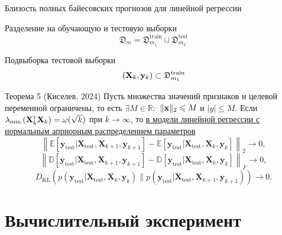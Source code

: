 \documentclass[aspectratio=169]{beamer}
\begin{document}
\begin{frame}{Близость полных байесовских прогнозов для линейной регрессии}
    \begin{block}{Разделение на обучающую и тестовую выборки}
        \vspace{-0.3cm}
        \[ \mathfrak{D}_m = \mathfrak{D}_{m_1}^{\text{train}} \sqcup \mathfrak{D}_{m_2}^{\text{test}} \]
        \vspace{-0.8cm}
    \end{block}
    \begin{block}{Подвыборка тестовой выборки}
        \vspace{-0.3cm}
        \[ \left( \mathbf{X}_k, \mathbf{y}_k \right) \subset \mathfrak{D}_{m_1}^{\text{train}} \]
        \vspace{-0.8cm}
    \end{block}
    \begin{block}{Теорема 5 (Киселев, 2024)}
        Пусть множества значений признаков и целевой переменной ограничены, то есть $\exists M \in \mathbb{R}:$ $\| \mathbf{x} \|_2 \leqslant M$ и $|y| \leqslant M$. Если  $\lambda_{\min}\left( \mathbf{X}^{\text{\tiny\sffamily\upshape\mdseries T}}_k \mathbf{X}_k \right) = \omega(\sqrt{k})$ при $k \to \infty$, то \underline{в модели линейной регрессии с нормальным априорным распределением параметров}\\
        \vspace{-0.3cm}
        \[ \left\|\mathbb{E}\left[ \mathbf{y}_{\mathrm{test}}|\mathbf{X_{\mathrm{test}}}, \mathbf{X}_{k+1}, \mathbf{y}_{k+1} \right] - \mathbb{E}\left[ \mathbf{y}_{\mathrm{test}}|\mathbf{X_{\mathrm{test}}}, \mathbf{X}_{k}, \mathbf{y}_{k} \right]\right\|_2 \to 0, \]
        \[ \left\|\mathbb{D}\left[ \mathbf{y}_{\mathrm{test}}|\mathbf{X_{\mathrm{test}}}, \mathbf{X}_{k+1}, \mathbf{y}_{k+1} \right] - \mathbb{D}\left[ \mathbf{y}_{\mathrm{test}}|\mathbf{X_{\mathrm{test}}}, \mathbf{X}_{k}, \mathbf{y}_{k} \right]\right\|_F \to 0, \]
        \[ D_{\mathrm{KL}}\left(p(\mathbf{y}_{\mathrm{test}}|\mathbf{X_{\mathrm{test}}}, \mathbf{X}_k, \mathbf{y}_k) \| p(\mathbf{y}_{\mathrm{test}}|\mathbf{X_{\mathrm{test}}}, \mathbf{X}_{k+1}, \mathbf{y}_{k+1})\right) \to 0.  \]
    \end{block}
\end{frame}

\section{Вычислительный эксперимент}
\end{document}
